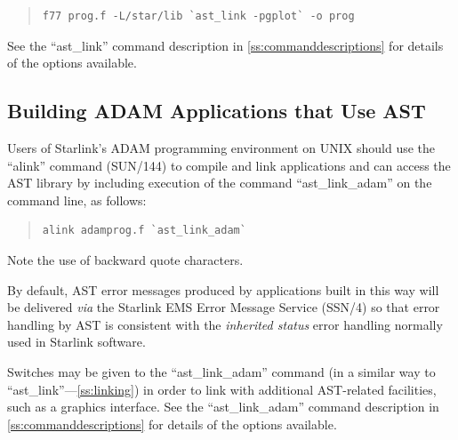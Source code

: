 \documentclass[twoside,11pt]{article}
\newcommand{\htmlref}[2]{#1}
\newcommand{\xref}[3]{#1}
\newcommand{\appref}[1]{Appendix~\ref{#1}}
\newcommand{\secref}[1]{\S\ref{#1}}
\renewcommand{\appref}[1]{\ref{#1}}
\renewcommand{\secref}[1]{\ref{#1}}
\begin{document}
\begin{quote}
\small
\begin{verbatim}
f77 prog.f -L/star/lib `ast_link -pgplot` -o prog
\end{verbatim}
\normalsize
\end{quote}

See the ``ast\_link'' command description in
\appref{ss:commanddescriptions} for details of the options available.

\subsection{Building ADAM Applications that Use AST}

Users of Starlink's \xref{ADAM}{sg4}{} programming environment
 on UNIX should use the
``\xref{alink}{sun144}{ADAM_link_scripts}'' command
(\xref{SUN/144}{sun144}{}) to compile and link applications and can
access the AST library by including execution of the command
``\htmlref{ast\_link\_adam}{ast_link_adam}'' on the command line, as follows:

\begin{quote}
\small
\begin{verbatim}
alink adamprog.f `ast_link_adam`
\end{verbatim}
\normalsize
\end{quote}

Note the use of backward quote characters.

By default, AST error messages produced by applications built in this
way will be delivered {\em{via}} the Starlink EMS Error Message
Service (\xref{SSN/4}{ssn4}{}) so that error handling by AST is
consistent with the \xref{{\em{inherited
status}}}{sun104}{inherited_status} error handling normally used in
Starlink software.

Switches may be given to the ``ast\_link\_adam'' command (in a similar
way to ``\htmlref{ast\_link}{ast_link}''---\secref{ss:linking}) in order to link with
additional AST-related facilities, such as a graphics interface. See
the ``ast\_link\_adam'' command description in
\appref{ss:commanddescriptions} for details of the options available.

\appendix



\end{document}
